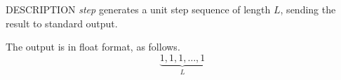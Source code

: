 % 
% 
% 
% 
%                                                                        
%

\begin{synopsis}
\item[step] [ --l $L$ ] [ --n $N$ ]
\end{synopsis}

\begin{qsection}{DESCRIPTION}
{\em step} generates a unit step sequence of length $L$, 
sending the result to standard output.

The output is in float format, as follows.
\begin{displaymath}
\underbrace{1, 1, 1, \ldots, 1}_{L}
\end{displaymath}
\end{qsection}

